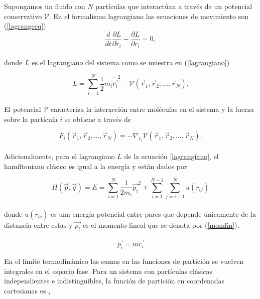 Supongamos un fluido con $N$ partículas que interactúan a través de un potencial conservativo $\mathcal{V}$. En el formalismo lagrangiano las ecuaciones de movimiento son (\ref{lagrangeeq}) \cite{torresdelcastillo_2018}\\

\begin{equation} \label{lagrangeeq}
    \frac{d}{dt}\frac{\partial L}{\partial \dot r_i} - \frac{\partial L}{\partial r_i} = 0,
\end{equation}\\
donde $L$ es el lagrangiano del sistema como se muestra en (\ref{lagrangiano})

\begin{equation} \label{lagrangiano}
    L = \sum_{i=1}^{N} \frac{1}{2}m_i\dot{\vec{r_i}}^2-\mathcal{V}({\vec{r}}_1,{\vec{r}}_2,...,{\vec{r}}_N).
\end{equation}\\
El potencial $\mathcal{V}$ caracteriza la interacción entre moléculas en el sistema \cite{torresdelcastillo_2018} y la fuerza sobre la partícula $i$ se obtiene a través de

\begin{equation}
    F_i({\vec{r}}_1,{\vec{r}}_2,...,{\vec{r}}_N) = -\nabla_{r_i}\mathcal{V}({\vec{r}}_1,{\vec{r}}_2,...,{\vec{r}}_N).
\end{equation}\\

Adicionalmente, para el lagrangiano $L$ de la ecuación \ref{lagrangiano}, el hamiltoniano clásico es igual a la energía y están dados por

\begin{equation} \label{hamiltoniano}
    H(\vec{p},\vec{q}) = E = \sum_{i=1}^{N} \frac{1}{2 m_i}\vec{p_i}^2 + \sum_{i=1}^{N-1}\sum_{j=i+1}^{N} u(r_{ij})
\end{equation}\\

donde $u(r_{ij})$ es una energía potencial entre pares que depende únicamente de la distancia entre estas y $\vec{p_i}$ es el momento lineal que se denota por (\ref{momlin}).

\begin{equation}\label{momlin}
    \vec{p_i} = m\dot{\vec{r_i}}
\end{equation}

En el límite termodinámico las sumas en las funciones de partición se vuelven integrales en el espacio fase. Para un sistema con partículas clásicas independientes e indistinguibles, la función de partición en coordenadas cartesianas es \cite{mcquarrie1976},

